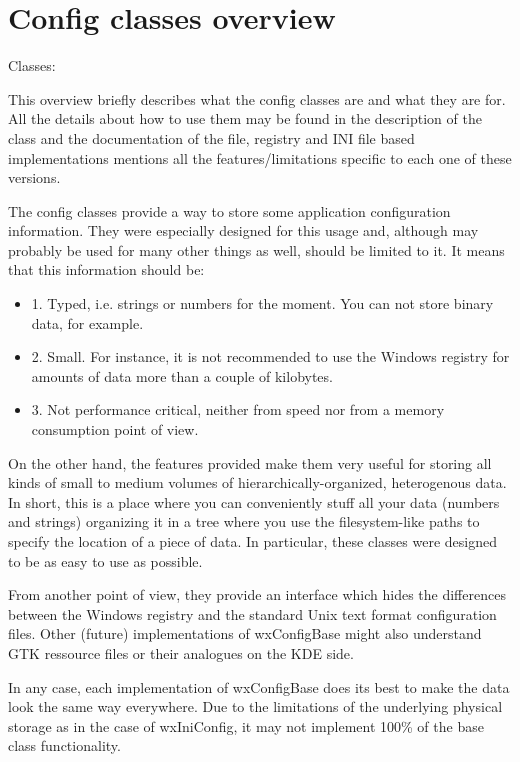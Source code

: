 \section{Config classes overview}\label{wxconfigoverview}

Classes: 

This overview briefly describes what the config classes are and what they are
for. All the details about how to use them may be found in the description of
the  class and the documentation of the
file, registry and INI file based implementations mentions all the
features/limitations specific to each one of these versions.

The config classes provide a way to store some application configuration
information. They were especially designed for this usage and, although may
probably be used for many other things as well, should be limited to it. It
means that this information should be:
\begin{itemize}
\item{1.} Typed, i.e. strings or numbers for the moment. You can not store
binary data, for example.
\item{2.} Small. For instance, it is not recommended to use the Windows
registry for amounts of data more than a couple of kilobytes.
\item{3.} Not performance critical, neither from speed nor from a memory
consumption point of view.
\end{itemize}

On the other hand, the features provided make them very useful for storing all
kinds of small to medium volumes of hierarchically-organized, heterogenous
data. In short, this is a place where you can conveniently stuff all your data
(numbers and strings) organizing it in a tree where you use the
filesystem-like paths to specify the location of a piece of data. In
particular, these classes were designed to be as easy to use as possible.

From another point of view, they provide an interface which hides the
differences between the Windows registry and the standard Unix text format
configuration files. Other (future) implementations of wxConfigBase might also
understand GTK ressource files or their analogues on the KDE side.

In any case, each implementation of wxConfigBase does its best to
make the data look the same way everywhere. Due
to the limitations of the underlying physical storage as in the case of
wxIniConfig, it may not implement 100\% of the base class functionality.

